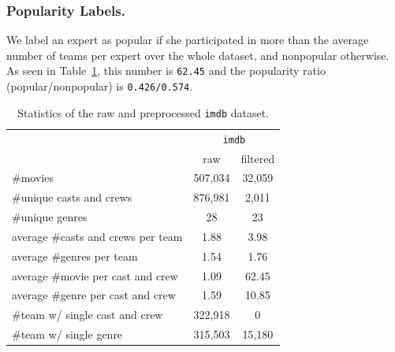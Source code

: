 \documentclass[runningheads]{llncs}
\begin{document}
\subsubsection{Popularity Labels.} We label an expert as popular if she participated in more than the average number of teams per expert over the whole dataset, and nonpopular otherwise. As seen in Table~\ref{tbl:stats}, this number is \texttt{62.45} and the popularity ratio (popular/nonpopular) is \texttt{0.426/0.574}. 
\begin{table}[t]
\caption{Statistics of the raw and preprocessed \texttt{imdb} dataset.}
\label{tbl:stats}
\centering
\vspace{-1em}
\begin{tabular}{lcc}
\cline{2-3}
 & \multicolumn{2}{c}{\texttt{imdb}} \\ \cline{2-3} 
\multicolumn{1}{c}{} & raw & filtered \\ \hline
\#movies & 507,034 & 32,059 \\
\#unique casts and crews & 876,981 & 2,011 \\
\#unique genres & 28 & 23 \\
average \#casts and crews per team & 1.88 & 3.98 \\
average \#genres per team & 1.54 & 1.76 \\
average \#movie per cast and crew & 1.09 & 62.45 \\
average \#genre per cast and crew & 1.59 & 10.85 \\
\#team w/ single cast and crew & 322,918 & 0 \\
\#team w/ single genre & 315,503 & 15,180 \\ \hline
\end{tabular}
\vspace{-1em}
\end{table}
\end{document}
